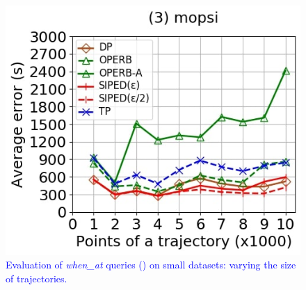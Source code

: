{\begin{figure}[tb!]
	\includegraphics[scale=0.250]{Figures/Exp-when-PED-error-size-mopsi.jpg}		
	\vspace{-2ex}
	\caption{\small \textcolor{blue}{Evaluation of \emph{when\_at} queries (\ped) on small datasets: varying the size of
		trajectories.}}
	\label{fig:query-when-ped-size}
	\vspace{-1ex}
\end{figure}

}
